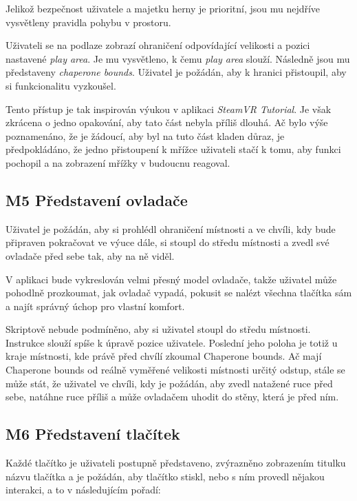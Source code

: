 Jelikož bezpečnost uživatele a majetku herny je prioritní, jsou mu nejdříve
vysvětleny pravidla pohybu v prostoru.

Uživateli se na podlaze zobrazí ohraničení odpovídající velikosti a
pozici nastavené \emph{play area}. Je mu vysvětleno, k čemu \emph{play
area} slouží. Následně jsou mu představeny \emph{chaperone bounds}.
Uživatel je požádán, aby k hranici přistoupil, aby si funkcionalitu
vyzkoušel.

Tento přístup je tak inspirován výukou v aplikaci \emph{SteamVR
Tutorial}. Je však zkrácena o jedno opakování, aby tato část nebyla
příliš dlouhá. Ač bylo výše poznamenáno, že je žádoucí, aby byl na tuto
část kladen důraz, je předpokládáno, že jedno přistoupení k mřížce uživateli
stačí k tomu, aby funkci pochopil a na zobrazení mřížky v budoucnu
reagoval.

\subsection{M5 Představení
ovladače}\label{m5-pux159edstavenuxed-ovladaux10de}

Uživatel je požádán, aby si prohlédl ohraničení místnosti a ve chvíli,
kdy bude připraven pokračovat ve výuce dále, si stoupl do středu
místnosti a zvedl své ovladače před sebe tak, aby na ně viděl.

V aplikaci bude vykreslován velmi přesný model ovladače, takže uživatel
může pohodlně prozkoumat, jak ovladač vypadá, pokusit se nalézt všechna
tlačítka sám a najít správný úchop pro vlastní komfort.

Skriptově nebude podmíněno, aby si uživatel stoupl do středu místnosti.
Instrukce slouží spíše k úpravě pozice uživatele. Poslední jeho poloha
je totiž u kraje místnosti, kde právě před chvílí zkoumal Chaperone
bounds. Ač mají Chaperone bounds od reálně vyměřené velikosti místnosti
určitý odstup, stále se může stát, že uživatel ve chvíli, kdy je
požádán, aby zvedl natažené ruce před sebe, natáhne ruce příliš a může
ovladačem uhodit do stěny, která je před ním.

\subsection{M6 Představení
tlačítek}\label{m6-pux159edstavenuxed-tlaux10duxedtek}

Každé tlačítko je uživateli postupně představeno, zvýrazněno zobrazením
titulku názvu tlačítka a je požádán, aby tlačítko stiskl, nebo s ním
provedl nějakou interakci, a to v následujícím pořadí:

